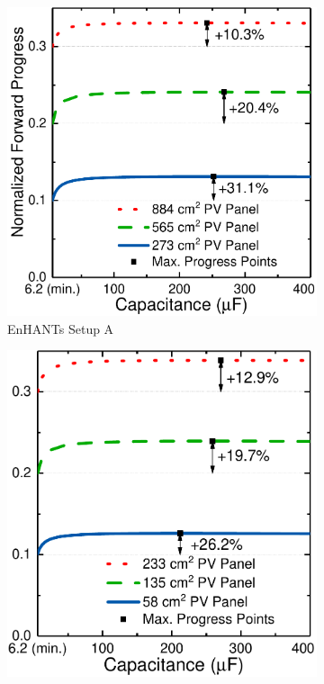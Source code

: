 \begin{figure}
    \centering
    \begin{subfigure}{0.49\columnwidth}
        \centering
        \includegraphics[width=\columnwidth]{ch4_sizingapproach/figures/HarvStorTgFig1}
        \caption{EnHANTs Setup A}
        \label{fig:harvstor1}
    \end{subfigure}
    \begin{subfigure}{0.49\columnwidth}
        \centering
        \includegraphics[width=\columnwidth]{ch4_sizingapproach/figures/HarvStorTgFig2}

\end{subfigure}
\end{figure}
